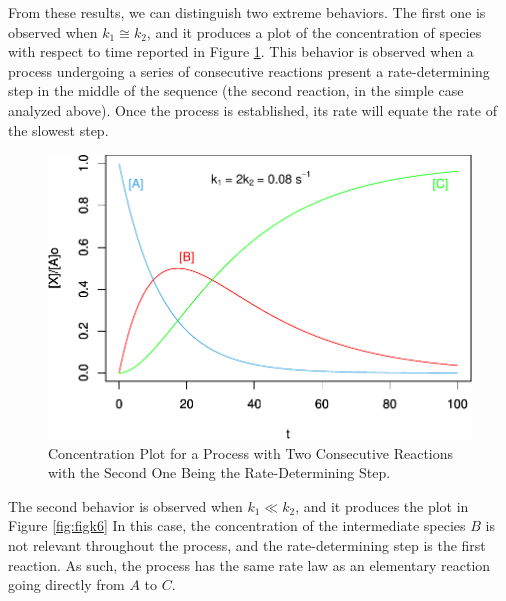 \documentclass[
  9pt,
]{extbook}
\theoremstyle{definition}
\theoremstyle{definition}
\theoremstyle{definition}
\theoremstyle{remark}
\begin{document}
From these results, we can distinguish two extreme behaviors. The first one is observed when \(k_1 \cong k_2\), and it produces a plot of the concentration of species with respect to time reported in Figure \ref{fig:figk5}. This behavior is observed when a process undergoing a series of consecutive reactions present a rate-determining step in the middle of the sequence (the second reaction, in the simple case analyzed above). Once the process is established, its rate will equate the rate of the slowest step.

\begin{figure}

{\centering \includegraphics{pchem1_files/figure-latex/figk5-1} 

}

\caption{Concentration Plot for a Process with Two Consecutive Reactions with the Second One Being the Rate-Determining Step.}\label{fig:figk5}
\end{figure}

The second behavior is observed when \(k_1\ll k_2\), and it produces the plot in Figure \ref{fig:figk6} In this case, the concentration of the intermediate species \(B\) is not relevant throughout the process, and the rate-determining step is the first reaction. As such, the process has the same rate law as an elementary reaction going directly from \(A\) to \(C\).
\end{document}
